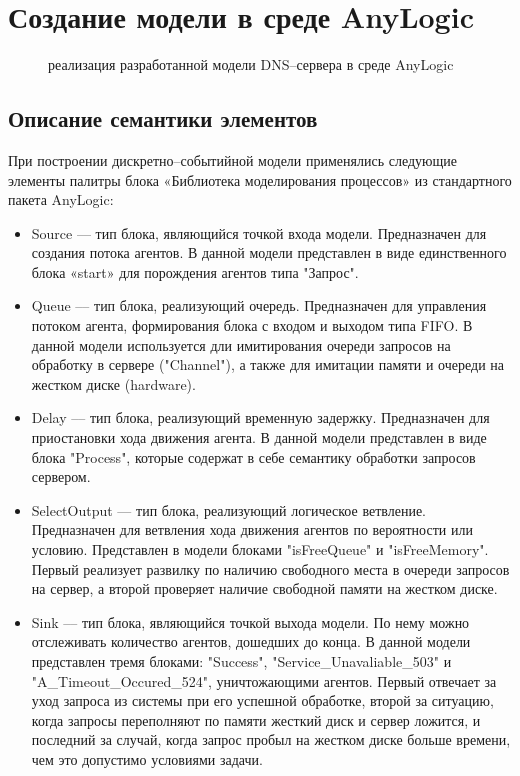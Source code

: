 \section{Создание модели в среде AnyLogic}
\begin{figure} [h]
    \caption{реализация разработанной модели DNS--сервера в среде AnyLogic}
\end{figure}


\subsection{Описание семантики элементов}
При построении дискретно--событийной модели применялись следующие
элементы палитры блока «Библиотека моделирования процессов» из стандартного
пакета AnyLogic:
\begin{itemize}
    \item Source –-- тип блока, являющийся точкой входа модели. Предназначен для
    создания потока агентов. В данной модели представлен в виде единственного
    блока «start» для порождения агентов типа "Запрос".
    \item Queue –-- тип блока, реализующий очередь. Предназначен для управления
    потоком агента, формирования блока с входом и выходом типа FIFO. В
    данной модели используется дли имитирования очереди запросов на
    обработку в сервере ("Channel"), а также для имитации памяти и очереди на жестком
    диске (hardware).
    \item Delay –-- тип блока, реализующий временную задержку. Предназначен для
    приостановки хода движения агента. В данной модели представлен в виде
    блока "Process", которые содержат в себе семантику обработки запросов
    сервером.
    \item SelectOutput --- тип блока, реализующий логическое ветвление.
    Предназначен для ветвления хода движения агентов по вероятности или
    условию. Представлен в модели блоками "isFreeQueue" и "isFreeMemory".
    Первый реализует развилку по наличию свободного места в очереди запросов на сервер,
    а второй проверяет наличие свободной памяти на жестком диске.
    \item Sink –-- тип блока, являющийся точкой выхода модели. По нему можно
    отслеживать количество агентов, дошедших до конца. В данной модели
    представлен тремя блоками: "Success", "Service\_Unavaliable\_503" и
    "A\_Timeout\_Occured\_524", уничтожающими агентов. Первый отвечает за уход запроса из системы при его
    успешной обработке, второй за ситуацию, когда запросы переполняют по памяти жесткий диск и
    сервер ложится, и последний за случай, когда запрос пробыл на жестком диске больше времени, чем это
    допустимо условиями задачи.
\end{itemize}

